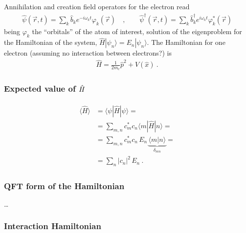 \documentclass[letterpaper,10pt,english]{jupyterBook}
\begin{document}
\sphinxAtStartPar
{} Annihilation and creation field operators for the electron read
\begin{equation*}
\begin{split}
\hat\psi(\vec{r},t)=\sum_k\hat b_ke^{-i\omega_kt}\varphi_k(\vec r) \quad ,\qquad
\hat\psi^\dagger(\vec r,t)=\sum_k\hat b^\dagger_ke^{i\omega_kt}\varphi^*_k(\vec r)
\end{split}
\end{equation*}
\sphinxAtStartPar
being \(\varphi_k\) the “orbitals” of the atom of interest, solution of the eigenproblem for the Hamiltonian of the system, \(\hat{H} | \psi_n \rangle = E_n | \psi_n \rangle\). The Hamiltonian for one electron (assuming no interaction between electrons?) is
\begin{equation*}
\begin{split}
\hat H=\frac1{2m_e}\hat p^2+V(\hat x) \ .
\end{split}
\end{equation*}\subsubsection*{Expected value of \protect\(\hat H\protect\)}
\begin{equation*}
\begin{split}\begin{aligned}
\langle \hat{H} \rangle
 & = \langle \psi | \hat{H} | \psi \rangle = \\
 & = \sum_{m,n} c_m^* c_n \langle m | \hat{H} | n \rangle = \\
 & = \sum_{m,n} c_m^* c_n \, E_n \, \underbrace{\langle m | n \rangle}_{\delta_{mn}} = \\
 & = \sum_{n} | c_n |^2 \, E_n \ .
\end{aligned}\end{split}
\end{equation*}

\subsubsection*{QFT form of the Hamiltonian}

\sphinxAtStartPar
…

\sphinxAtStartPar
{} 


\subsubsection*{Interaction Hamiltonian}
\end{document}
